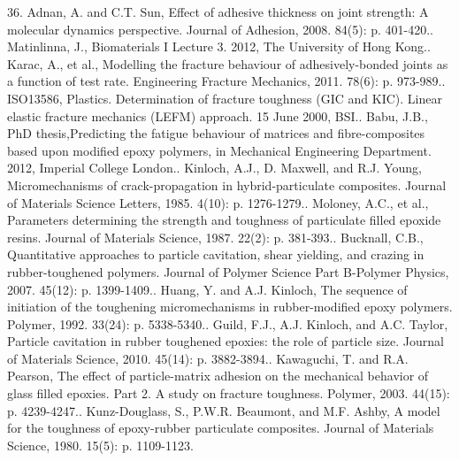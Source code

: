 \documentclass[numbers=noendperiod,chapterprefix=on]{icldt} %
\begin{document}
36.	Adnan, A. and C.T. Sun, Effect of adhesive thickness on joint strength: A molecular dynamics perspective. Journal of Adhesion, 2008. 84(5): p. 401-420..	Matinlinna, J., Biomaterials I Lecture 3. 2012, The University of Hong Kong..	Karac, A., et al., Modelling the fracture behaviour of adhesively-bonded joints as a function of test rate. Engineering Fracture Mechanics, 2011. 78(6): p. 973-989..	ISO13586, Plastics. Determination of fracture toughness (GIC and KIC). Linear elastic fracture mechanics (LEFM) approach. 15 June 2000, BSI..	Babu, J.B., PhD thesis,Predicting the fatigue behaviour of matrices and fibre-composites based upon modified epoxy polymers, in Mechanical Engineering Department. 2012, Imperial College London..	Kinloch, A.J., D. Maxwell, and R.J. Young, Micromechanisms of crack-propagation in hybrid-particulate composites. Journal of Materials Science Letters, 1985. 4(10): p. 1276-1279..	Moloney, A.C., et al., Parameters determining the strength and toughness of particulate filled epoxide resins. Journal of Materials Science, 1987. 22(2): p. 381-393..	Bucknall, C.B., Quantitative approaches to particle cavitation, shear yielding, and crazing in rubber-toughened polymers. Journal of Polymer Science Part B-Polymer Physics, 2007. 45(12): p. 1399-1409..	Huang, Y. and A.J. Kinloch, The sequence of initiation of the toughening micromechanisms in rubber-modified epoxy polymers. Polymer, 1992. 33(24): p. 5338-5340..	Guild, F.J., A.J. Kinloch, and A.C. Taylor, Particle cavitation in rubber toughened epoxies: the role of particle size. Journal of Materials Science, 2010. 45(14): p. 3882-3894..	Kawaguchi, T. and R.A. Pearson, The effect of particle-matrix adhesion on the mechanical behavior of glass filled epoxies. Part 2. A study on fracture toughness. Polymer, 2003. 44(15): p. 4239-4247..	Kunz-Douglass, S., P.W.R. Beaumont, and M.F. Ashby, A model for the toughness of epoxy-rubber particulate composites. Journal of Materials Science, 1980. 15(5): p. 1109-1123.\newline
\end{document}
